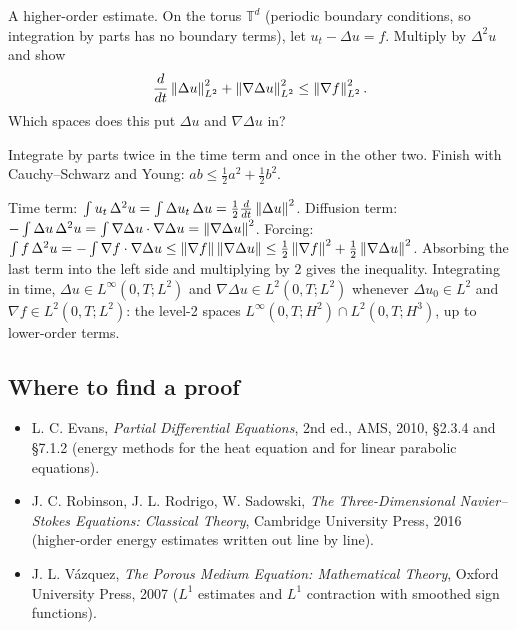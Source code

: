 \begin{exercise}
  A higher-order estimate. On the torus $\mathbb{T}^d$ (periodic boundary conditions, so integration by parts has no boundary terms), let $u_t - \Delta u = f$. Multiply by $\Delta^2 u$ and show
  \[
  \frac{d}{dt}\left\lVert \Delta u\right\rVert_{L^2}^2 + \left\lVert \nabla\Delta u\right\rVert_{L^2}^2 \le \left\lVert \nabla f\right\rVert_{L^2}^2 .
  \]
  Which spaces does this put $\Delta u$ and $\nabla\Delta u$ in?
  \begin{hint}
    Integrate by parts twice in the time term and once in the other two. Finish with Cauchy--Schwarz and Young: $ab \le \frac12a^2 + \frac12b^2$.
  \end{hint}
  \begin{solution}
    Time term: $\int u_t\,\Delta^2u = \int \Delta u_t\,\Delta u = \frac12\frac{d}{dt}\left\lVert \Delta u\right\rVert^2$. Diffusion term: $-\int\Delta u\,\Delta^2u = \int\nabla\Delta u\cdot\nabla\Delta u = \left\lVert \nabla\Delta u\right\rVert^2$. Forcing: $\int f\,\Delta^2u = -\int\nabla f\cdot\nabla\Delta u \le \left\lVert \nabla f\right\rVert\left\lVert \nabla\Delta u\right\rVert \le \frac12\left\lVert \nabla f\right\rVert^2 + \frac12\left\lVert \nabla\Delta u\right\rVert^2$. Absorbing the last term into the left side and multiplying by $2$ gives the inequality. Integrating in time, $\Delta u \in L^\infty(0,T;L^2)$ and $\nabla\Delta u \in L^2(0,T;L^2)$ whenever $\Delta u_0 \in L^2$ and $\nabla f \in L^2(0,T;L^2)$: the level-2 spaces $L^\infty(0,T;H^2)\cap L^2(0,T;H^3)$, up to lower-order terms.
  \end{solution}
\end{exercise}

\subsection*{Where to find a proof}

\begin{itemize}
\item L. C. Evans, \emph{Partial Differential Equations}, 2nd ed., AMS, 2010, §2.3.4 and §7.1.2 (energy methods for the heat equation and for linear parabolic equations).
\item J. C. Robinson, J. L. Rodrigo, W. Sadowski, \emph{The Three-Dimensional Navier--Stokes Equations: Classical Theory}, Cambridge University Press, 2016 (higher-order energy estimates written out line by line).
\item J. L. Vázquez, \emph{The Porous Medium Equation: Mathematical Theory}, Oxford University Press, 2007 ($L^1$ estimates and $L^1$ contraction with smoothed sign functions).
\end{itemize}

\neededfor
